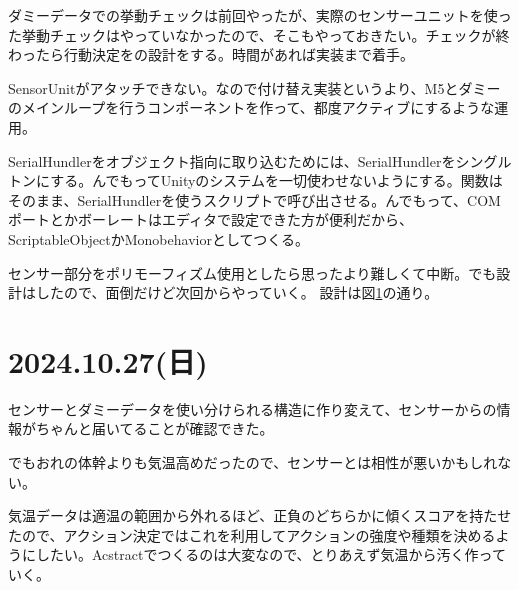 \documentclass[fleqn,twocolumn]{mynote}
\begin{document}
ダミーデータでの挙動チェックは前回やったが、実際のセンサーユニットを使った挙動チェックはやっていなかったので、そこもやっておきたい。チェックが終わったら行動決定をの設計をする。時間があれば実装まで着手。

SensorUnitがアタッチできない。なので付け替え実装というより、M5とダミーのメインループを行うコンポーネントを作って、都度アクティブにするような運用。

SerialHundlerをオブジェクト指向に取り込むためには、SerialHundlerをシングルトンにする。んでもってUnityのシステムを一切使わせないようにする。関数はそのまま、SerialHundlerを使うスクリプトで呼び出させる。んでもって、COMポートとかボーレートはエディタで設定できた方が便利だから、ScriptableObjectかMonobehaviorとしてつくる。

センサー部分をポリモーフィズム使用としたら思ったより難しくて中断。でも設計はしたので、面倒だけど次回からやっていく。
設計は図\ref{fig:serial-config}の通り。

\fboxsep=0pt            %
\fboxrule=1pt            %
\begin{figure}[h]
  \centering
  \caption{}
  \label{fig:serial-config}
\end{figure}

\section*{2024.10.27(日)}
センサーとダミーデータを使い分けられる構造に作り変えて、センサーからの情報がちゃんと届いてることが確認できた。

でもおれの体幹よりも気温高めだったので、センサーとは相性が悪いかもしれない。

気温データは適温の範囲から外れるほど、正負のどちらかに傾くスコアを持たせたので、アクション決定ではこれを利用してアクションの強度や種類を決めるようにしたい。Acstractでつくるのは大変なので、とりあえず気温から汚く作っていく。
\end{document}
